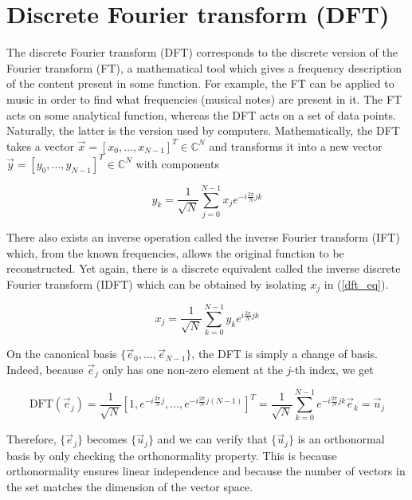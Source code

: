 \section{Discrete Fourier transform (DFT)}
The discrete Fourier transform (DFT) corresponds to the discrete version of the Fourier transform (FT), a mathematical tool which gives a frequency description of the content present in some function. For example, the FT can be applied to music in order to find what frequencies (musical notes) are present in it. The FT acts on some analytical function, whereas the DFT acts on a set of data points. Naturally, the latter is the version used by computers. Mathematically, the DFT takes a vector $\vec{x} = \left[x_0, ..., x_{N-1}\right]^T \in \mathbb{C}^N$ and transforms it into a new vector $\vec{y} = \left[y_0, ..., y_{N-1}\right]^T \in \mathbb{C}^N$ with components 

\begin{equation}
    y_k = \frac{1}{\sqrt{N}}\sum_{j=0}^{N-1}x_j e^{-i\frac{2\pi}{N}jk}
    \label{dft_eq}
\end{equation}

There also exists an inverse operation called the inverse Fourier transform (IFT) which, from the known frequencies, allows the original function to be reconstructed. Yet again, there is a discrete equivalent called the inverse discrete Fourier transform (IDFT) which can be obtained by isolating $x_j$ in (\ref{dft_eq}). 

\begin{equation}
    x_j = \frac{1}{\sqrt{N}}\sum_{k=0}^{N-1}y_k e^{i\frac{2\pi}{N}jk}
    \label{idft_eq} 
\end{equation}

On the canonical basis $\{\vec{e}_0, ..., \vec{e}_{N-1}\}$, the DFT is simply a change of basis. Indeed, because $\vec{e}_j$ only has one non-zero element at the $j$-th index, we get 

\begin{equation}
    \text{DFT}(\vec{e}_j) = \frac{1}{\sqrt{N}}\left[1, e^{-i\frac{2\pi}{N}j}, ..., e^{-i\frac{2\pi}{N}j(N-1)}\right]^T = \frac{1}{\sqrt{N}}\sum_{k=0}^{N-1}e^{-i\frac{2\pi}{N}jk}\vec{e}_k = \vec{u}_j
    \label{dft_eq_canonical}
\end{equation}

Therefore, $\{\vec{e}_j\}$ becomes $\{\vec{u}_j\}$ and we can verify that $\{\vec{u}_j\}$ is an orthonormal basis by only checking the orthonormality property. This is because orthonormality ensures linear independence and because the number of vectors in the set matches the dimension of the vector space.

